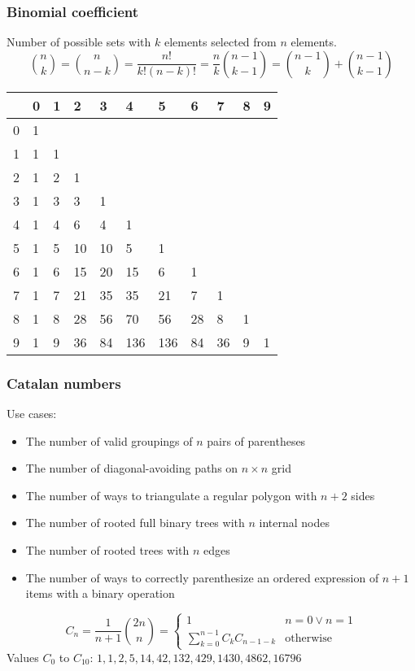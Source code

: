 \subsubsection{Binomial coefficient}
Number of possible sets with $k$ elements selected from $n$ elements. 
\begin{equation*}
  \binom{n}{k} = \binom{n}{n - k} = \frac{n!}{k!(n - k)!} =
  \frac{n}{k}\binom{n - 1}{k - 1} = \binom{n - 1}{k} + \binom{n - 1}{k
  - 1}
\end{equation*}
\begin{center}
	\begin{tabular}{ |l||l|l|l|l|l|l|l|l|l|l| } 
		\hline
		\diagbox{$n$}{$k$} & 0 & 1 & 2 & 3 & 4 & 5 & 6 & 7 & 8 & 9\\
		\hline\hline
		0 &  1 &   &    &    &     &     &    &    &  &  \\
		1 &  1 & 1 &    &    &     &     &    &    &  &  \\
		2 &  1 & 2 & 1  &    &     &     &    &    &  &  \\
		3 &  1 & 3 & 3  & 1  &     &     &    &    &  &  \\
		4 &  1 & 4 & 6  & 4  & 1   &     &    &    &  &  \\
		5 &  1 & 5 & 10 & 10 & 5   & 1   &    &    &  &  \\
		6 &  1 & 6 & 15 & 20 & 15  & 6   & 1  &    &  &  \\
		7 &  1 & 7 & 21 & 35 & 35  & 21  & 7  & 1  &  &  \\
		8 &  1 & 8 & 28 & 56 & 70  & 56  & 28 & 8  & 1&  \\
		9 &  1 & 9 & 36 & 84 & 136 & 136 & 84 & 36 & 9& 1\\
		\hline
	\end{tabular}
\end{center}
\subsubsection{Catalan numbers}
Use cases:
\begin{itemize}
\item The number of valid groupings of $n$ pairs of parentheses
\item The number of diagonal-avoiding paths on $n\times n$ grid
\item The number of ways to triangulate a regular polygon with $n + 2$
  sides
\item The number of rooted full binary trees with $n$ internal nodes
\item The number of rooted trees with $n$ edges
\item The number of ways to correctly parenthesize an ordered expression of $n
  + 1$ items with a binary operation
\end{itemize}
\begin{equation*}
  C_n = \frac{1}{n + 1}\binom{2n}{n} =
  \begin{cases}
    1 & n = 0 \lor n = 1\\
    \sum\limits_{k = 0}^{n - 1}C_kC_{n - 1 - k} & \text{otherwise}
  \end{cases}
\end{equation*}
Values $C_0$ to $C_{10}$: $1, 1, 2, 5, 14, 42, 132, 429, 1430, 4862, 16796$

